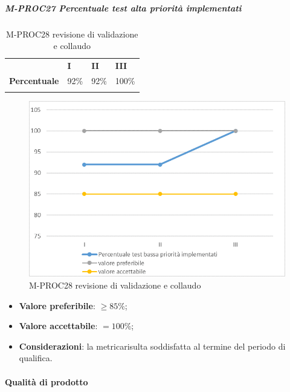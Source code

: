 \subparagraph{M-PROC27 Percentuale test alta priorità implementati} \mbox{}
\begin{longtable}[H!] {						
		>{}p{50mm}  		
		>{}p{8mm}
		>{}p{8mm}		
		>{}p{8mm}		
	}
	\rowcolor{gray!50}
	\textbf{} & \textbf{I} & \textbf{II} & \textbf{III}  \TBstrut \\ [2mm]
	\textbf{Percentuale} & 92\% & 92\% & 100\%  \TBstrut \\ [2mm]
	\rowcolor{white}
	\caption{M-PROC28 revisione di validazione e collaudo}
\end{longtable}
\begin{figure}[H] 	
	\includegraphics[width=\linewidth]{./img/grafici/RA28.png}	
	\caption{M-PROC28 revisione di validazione e collaudo}	
\end{figure}
\begin{itemize}
	\item \textbf{Valore preferibile}: $\ge 85\%$;
	\item \textbf{Valore accettabile}: $= 100\%$;
	\item \textbf{Considerazioni}: la metrica\glosp risulta soddisfatta al termine del periodo di qualifica.
\end{itemize}

\paragraph{Qualità di prodotto}

